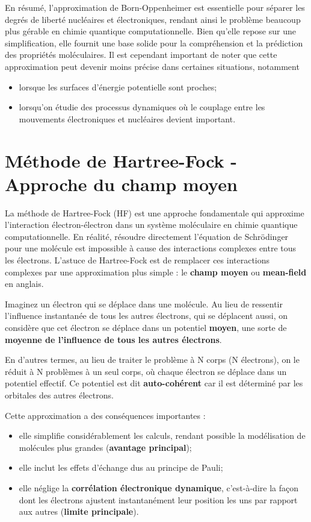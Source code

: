 \documentclass[12pt,a4paper]{article} %
\numberwithin{equation}{section} %
\numberwithin{figure}{section} %
\numberwithin{table}{section} %
\begin{document}
En résumé, l'approximation de Born-Oppenheimer est essentielle pour séparer les degrés de liberté nucléaires et électroniques, rendant ainsi le problème beaucoup plus gérable en chimie quantique computationnelle. Bien qu'elle repose sur une simplification, elle fournit une base solide pour la compréhension et la prédiction des propriétés moléculaires. Il est cependant important de noter que cette approximation peut devenir moins précise dans certaines situations, notamment
\begin{itemize}
\item lorsque les surfaces d'énergie potentielle sont proches;
\item lorsqu'on étudie des processus dynamiques où le couplage entre les mouvements électroniques et nucléaires devient important.
\end{itemize}

\section{Méthode de Hartree-Fock - Approche du champ moyen}

La méthode de Hartree-Fock (HF) est une approche fondamentale qui approxime l'interaction électron-électron dans un système moléculaire en chimie quantique computationnelle. En réalité, résoudre directement l'équation de Schrödinger pour une molécule est impossible à cause des interactions complexes entre tous les électrons. L'astuce de Hartree-Fock est de remplacer ces interactions complexes par une approximation plus simple : le \textbf{champ moyen} ou \textbf{mean-field} en anglais.

Imaginez un électron qui se déplace dans une molécule. Au lieu de ressentir l'influence instantanée de tous les autres électrons, qui se déplacent aussi, on considère que cet électron se déplace dans un potentiel \textbf{moyen}, une sorte de \textbf{moyenne de l'influence de tous les autres électrons}.

En d'autres termes, au lieu de traiter le problème à N corps (N électrons), on le réduit à N problèmes à un seul corps, où chaque électron se déplace dans un potentiel effectif. Ce potentiel est dit \textbf{auto-cohérent} car il est déterminé par les orbitales des autres électrons.

Cette approximation a des conséquences importantes :
\begin{itemize}
    \item elle simplifie considérablement les calculs, rendant possible la modélisation de molécules plus grandes (\textbf{avantage principal});
    \item elle inclut les effets d'échange dus au principe de Pauli;
    \item elle néglige la \textbf{corrélation électronique dynamique}, c'est-à-dire la façon dont les électrons ajustent instantanément leur position les uns par rapport aux autres (\textbf{limite principale}).
\end{itemize}
\end{document}
